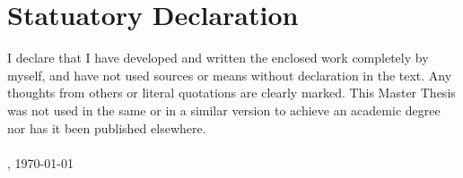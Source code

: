 \documentclass[Masterthesis.tex]{subfiles}
\begin{document}
\chapter*{Statuatory Declaration}
I declare that I have developed and written the enclosed work completely by myself, and have not used sources or means without declaration in the text. Any thoughts from others or literal quotations are clearly marked. This Master Thesis was not used in the same or in a similar version to achieve an academic degree nor has it been published elsewhere.\\\\

\noindent
\getCity, \today\\

\hfill \makebox[5cm]{\hrulefill}

\hfill \getAuthor\\
\end{document}
